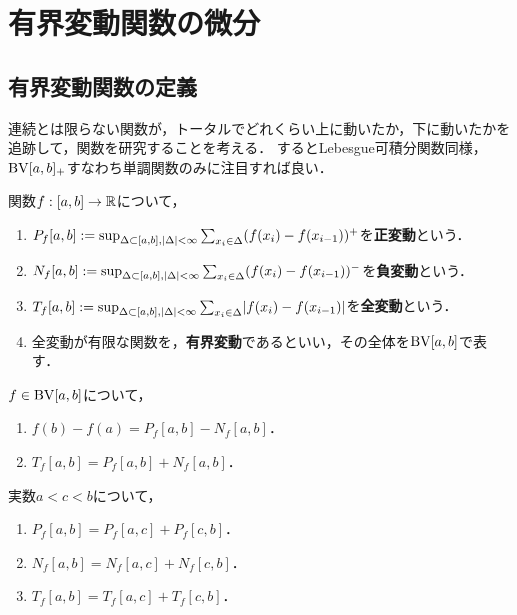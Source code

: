 \documentclass[uplatex, dvipdfmx]{jsreport}
\begin{document}
\section{有界変動関数の微分}

\subsection{有界変動関数の定義}

\begin{tcolorbox}[colframe=ForestGreen, colback=ForestGreen!10!white,breakable,colbacktitle=ForestGreen!40!white,coltitle=black,fonttitle=\bfseries\sffamily,
title=]
    連続とは限らない関数が，トータルでどれくらい上に動いたか，下に動いたかを追跡して，関数を研究することを考える．
    するとLebesgue可積分関数同様，$\mathrm{BV}[a,b]_+$すなわち単調関数のみに注目すれば良い．
\end{tcolorbox}

\begin{definition}
    関数$f:[a,b]\to\mathbb{R}$について，
    \begin{enumerate}
        \item $P_f[a,b]:=\sup_{\Delta\subset[a,b],\lvert\Delta\rvert<\infty}\sum_{x_i\in\Delta}(f(x_i)-f(x_{i-1}))^+$を\textbf{正変動}という．
        \item $N_f[a,b]:=\sup_{\Delta\subset[a,b],\lvert\Delta\rvert<\infty}\sum_{x_i\in\Delta}(f(x_i)-f(x_{i-1}))^-$を\textbf{負変動}という．
        \item $T_f[a,b]:=\sup_{\Delta\subset[a,b],\lvert\Delta\rvert<\infty}\sum_{x_i\in\Delta}\lvert f(x_i)-f(x_{i-1})\rvert$を\textbf{全変動}という．
        \item 全変動が有限な関数を，\textbf{有界変動}であるといい，その全体を$\mathrm{BV}[a,b]$で表す．
    \end{enumerate}
\end{definition}

\begin{proposition}
    $f\in\mathrm{BV}[a,b]$について，
    \begin{enumerate}
        \item $f(b)-f(a)=P_f[a,b]-N_f[a,b]$．
        \item $T_f[a,b]=P_f[a,b]+N_f[a,b]$．
    \end{enumerate}
\end{proposition}

\begin{proposition}
    実数$a<c<b$について，
    \begin{enumerate}
        \item $P_f[a,b]=P_f[a,c]+P_f[c,b]$．
        \item $N_f[a,b]=N_f[a,c]+N_f[c,b]$．
        \item $T_f[a,b]=T_f[a,c]+T_f[c,b]$．
    \end{enumerate}
\end{proposition}
\end{document}
